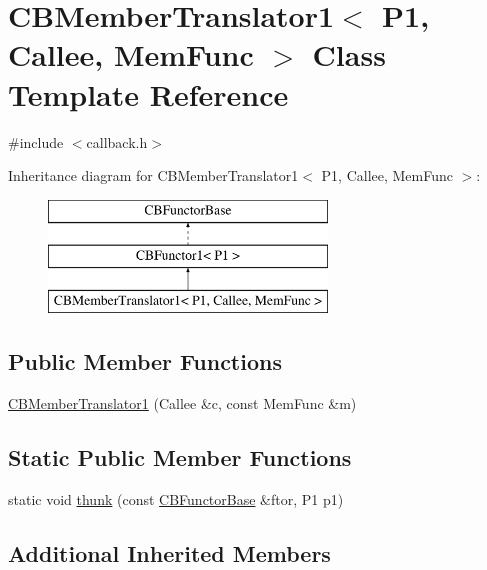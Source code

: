 \hypertarget{class_c_b_member_translator1}{\section{C\+B\+Member\+Translator1$<$ P1, Callee, Mem\+Func $>$ Class Template Reference}
\label{class_c_b_member_translator1}
}


{\ttfamily \#include $<$callback.\+h$>$}

Inheritance diagram for C\+B\+Member\+Translator1$<$ P1, Callee, Mem\+Func $>$\+:\begin{figure}[H]
\begin{center}
\leavevmode
\includegraphics[height=3.000000cm]{class_c_b_member_translator1}
\end{center}
\end{figure}
\subsection*{Public Member Functions}
\begin{DoxyCompactItemize}
\item 
\hyperlink{class_c_b_member_translator1_ab7349f1696db7d061f6a712a50c44f6b}{C\+B\+Member\+Translator1} (Callee \&c, const Mem\+Func \&m)
\end{DoxyCompactItemize}
\subsection*{Static Public Member Functions}
\begin{DoxyCompactItemize}
\item 
static void \hyperlink{class_c_b_member_translator1_a3946d0edab5f98a04d049f61b3b17b77}{thunk} (const \hyperlink{class_c_b_functor_base}{C\+B\+Functor\+Base} \&ftor, P1 p1)
\end{DoxyCompactItemize}
\subsection*{Additional Inherited Members}


